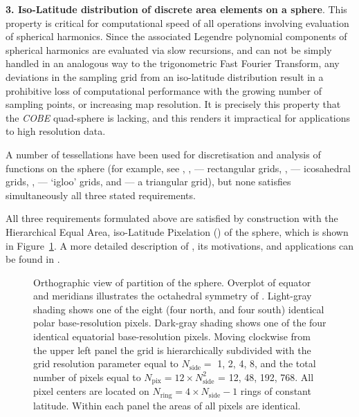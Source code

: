 \documentclass[12pt,twoside]{article}
\newcommand{\npix}{N_{\mathrm{pix}}}
\newcommand{\nside}{N_{\mathrm{side}}}
\begin{document}
\textbf{3. Iso-Latitude distribution of discrete area elements on a sphere}.  
This property
is critical for computational speed of all operations involving evaluation of 
spherical
harmonics. Since the associated Legendre polynomial components of
spherical harmonics are evaluated via
slow recursions, and 
can not be simply handled in an analogous way to the trigonometric Fast Fourier Transform, 
any deviations in the sampling grid from an iso-latitude
distribution result in a prohibitive loss of computational performance
with the growing number of sampling points, or increasing map resolution.
It is precisely this property that the {\it COBE} quad-sphere is lacking,
and this renders it impractical for applications to high resolution data.


A number of tessellations 
have been  used for discretisation and analysis 
of functions on the sphere (for example, see  
\cite{drhea},
\cite{munavi}, \cite{glesp} --- rectangular grids,
\cite{baum},  \cite{teg} --- icosahedral grids,
\cite{mathint},  \cite{crtu} ---  `igloo' grids,
and \cite{szalay}  --- a triangular grid), but none 
satisfies simultaneously all three stated requirements. 

All three requirements formulated above are satisfied by construction with the
Hierarchical Equal Area, iso-Latitude Pixelation (\healpixns) 
of the sphere, which is shown in Figure~\ref{fig:HEALPIX}.
A more detailed description of
\healpixns, its motivations, and applications can be found in \cite{gorskihealpix05}.

\begin{figure}[!ht]
\caption[Orthographic view of Healpix partition of the sphere]{%
\label{fig:HEALPIX}%
Orthographic view of \healpix partition of the sphere. 
Overplot of equator and  meridians illustrates the octahedral symmetry of  
\healpixns. 
Light-gray shading shows one of the eight (four north, and four south) 
identical polar 
base-resolution pixels. 
Dark-gray shading shows one of the four identical equatorial 
base-resolution pixels. 
Moving clockwise from the upper left 
panel the grid is hierarchically subdivided with 
the grid resolution parameter equal to 
$\nside =$ 1, 2, 4, 8, 
and the total number of pixels  equal to 
$\npix = 12 \times \nside^2$ = 12, 48, 192, 768. 
All pixel centers are located on $N_{\mathrm{ring}} = 4 \times \nside - 1$ rings of 
constant latitude.
Within each panel the areas of all pixels are identical.}
\end{figure}
\end{document}
